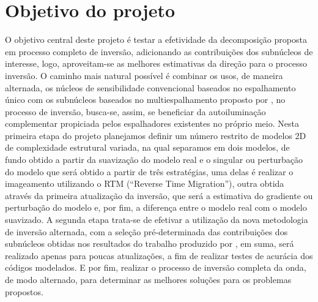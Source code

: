 \section{Objetivo do projeto}
O objetivo central deste projeto é testar a efetividade da decomposição proposta em processo completo de inversão, adicionando as contribuições dos subnúcleos de interesse, logo, aproveitam-se as melhores estimativas da direção para o processo inversão. O caminho mais natural possível é combinar os usos, de maneira alternada, os núcleos de sensibilidade convencional baseados no espalhamento único com os subnúcleos baseados no multiespalhamento proposto por \citet{macedo_2014}, no processo de inversão, busca-se, assim, se beneficiar da autoiluminação complementar propiciada pelos espalhadores existentes no próprio meio. Nesta primeira etapa do projeto planejamos definir um número restrito de modelos 2D
de complexidade estrutural variada, na qual separamos em dois modelos, de fundo obtido a partir da suavização do modelo real e o singular ou perturbação do modelo que será obtido a partir de três estratégias, uma delas é realizar o imageamento utilizando o RTM (``Reverse Time Migration''), outra obtida através da primeira atualização da inversão, que será a estimativa do gradiente ou perturbação do modelo e, por fim, a diferença entre o modelo real com o modelo suavizado. A segunda etapa trata-se de efetivar a utilização da nova metodologia de inversão alternada, com a seleção pré-determinada das contribuições dos subnúcleos obtidas nos resultados do trabalho produzido por \citet{macedo_2014}, em suma, será realizado apenas para poucas atualizações, a fim de realizar testes de acurácia  dos códigos modelados. E por fim, realizar o processo de inversão completa da onda, de modo alternado, para determinar as melhores soluções para os problemas propostos.